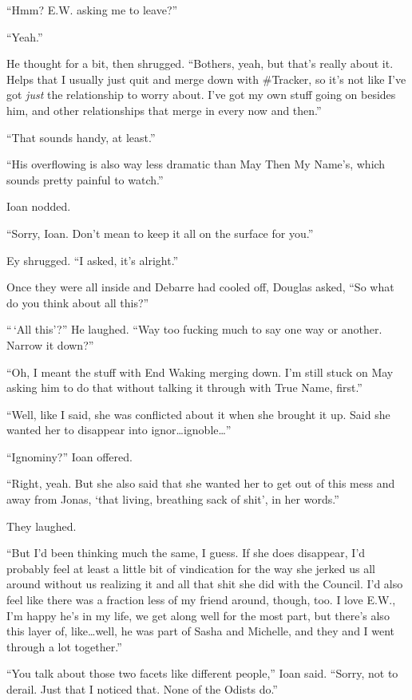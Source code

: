 ``Hmm? E.W. asking me to leave?''

``Yeah.''

He thought for a bit, then shrugged. ``Bothers, yeah, but that's really about it. Helps that I usually just quit and merge down with \#Tracker, so it's not like I've got \emph{just} the relationship to worry about. I've got my own stuff going on besides him, and other relationships that merge in every now and then.''

``That sounds handy, at least.''

``His overflowing is also way less dramatic than May Then My Name's, which sounds pretty painful to watch.''

Ioan nodded.

``Sorry, Ioan. Don't mean to keep it all on the surface for you.''

Ey shrugged. ``I asked, it's alright.''

Once they were all inside and Debarre had cooled off, Douglas asked, ``So what do you think about all this?''

``\,`All this'?'' He laughed. ``Way too fucking much to say one way or another. Narrow it down?''

``Oh, I meant the stuff with End Waking merging down. I'm still stuck on May asking him to do that without talking it through with True Name, first.''

``Well, like I said, she was conflicted about it when she brought it up. Said she wanted her to disappear into ignor\ldots ignoble\ldots{}''

``Ignominy?'' Ioan offered.

``Right, yeah. But she also said that she wanted her to get out of this mess and away from Jonas, `that living, breathing sack of shit', in her words.''

They laughed.

``But I'd been thinking much the same, I guess. If she does disappear, I'd probably feel at least a little bit of vindication for the way she jerked us all around without us realizing it and all that shit she did with the Council. I'd also feel like there was a fraction less of my friend around, though, too. I love E.W., I'm happy he's in my life, we get along well for the most part, but there's also this layer of, like\ldots well, he was part of Sasha and Michelle, and they and I went through a lot together.''

``You talk about those two facets like different people,'' Ioan said. ``Sorry, not to derail. Just that I noticed that. None of the Odists do.''

